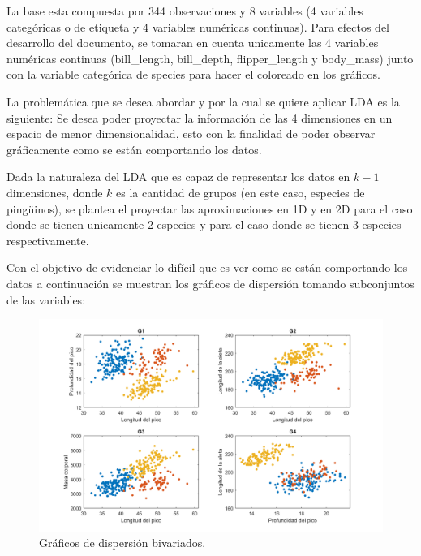 \documentclass[11pt, letterpaper]{article}
\begin{document}
La base esta compuesta por 344 observaciones y 8 variables (4 variables categóricas o de etiqueta y 4 variables numéricas continuas). Para efectos del desarrollo del documento, se tomaran en cuenta unicamente las 4 variables numéricas continuas (bill\_length, bill\_depth, flipper\_length y body\_mass) junto con la variable categórica de species para hacer el coloreado en los gráficos.

\newpage

La problemática que se desea abordar y  por la cual se quiere aplicar LDA es la siguiente: Se desea poder proyectar la información de las 4 dimensiones en un espacio de menor dimensionalidad, esto con la finalidad de poder observar gráficamente como se están comportando los datos.

Dada la naturaleza del LDA que es capaz de representar los datos en $k-1$ dimensiones, donde $k$ es la cantidad de grupos (en este caso, especies de pingüinos), se plantea el proyectar las aproximaciones en 1D y en 2D para el caso donde se tienen unicamente 2 especies y para el caso donde se tienen 3 especies respectivamente.

Con el objetivo de evidenciar lo difícil que es ver como se están comportando los datos a continuación se muestran los gráficos de dispersión tomando subconjuntos de las variables:

\begin{figure}[h!]
	\centering
	\begin{minipage}{1.1\textwidth}
		\centering
		\includegraphics[width=\textwidth]{IMG/G1.png}
		\caption{Gráficos de dispersión bivariados.}
		\label{fig:f2}
	\end{minipage}\hfill
\end{figure}
\end{document}
